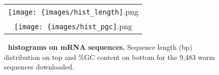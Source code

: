 % 
%

\begin{figure}[!h]

\begin{tabular}{c}
  \texttt{[image: \{images/hist\_length]}.png} \\
  \texttt{[image: \{images/hist\_pgc]}.png}    \\
\end{tabular}

\caption[\cele\ histograms on mRNA sequences]{%
\label{fig:histograms}\textbf{\cele\ histograms on mRNA sequences.} Sequence length (bp) distribution on top and \%GC content on bottom for the 9,483 worm sequences downloaded. 
}%

\end{figure}